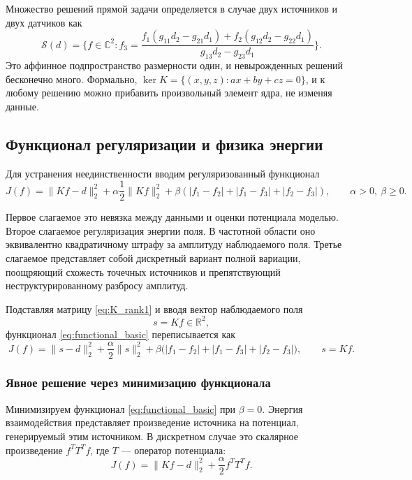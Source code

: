 \documentclass[sn-mathphys-num]{bst/sn-jnl}
\theoremstyle{thmstylethree}
\theoremstyle{thmstyletwo}
\theoremstyle{thmstyleone}
\begin{document}
Множество решений прямой задачи определяется в случае двух источников и двух датчиков как
\begin{equation}\label{eq:data_line}
    \mathcal{S}(d)=\{f\in\mathbb{C}^2: f_3 = \frac{f_1(g_{11}d_2 - g_{21}d_1) + f_2(g_{12}d_2-g_{22}d_1)}{g_{13}d_2-g_{23}d_1}\}.
\end{equation}
Это аффинное подпространство размерности один, и невырожденных решений бесконечно много. 
Формально, $\ker K=\{(x,y,z): a x+b y+c z=0\}$, и к любому решению можно прибавить произвольный элемент ядра, не изменяя данные.

\subsection{Функционал регуляризации и физика энергии}

Для устранения неединственности вводим регуляризованный функционал
\begin{equation}\label{eq:functional_basic}
    J(f)=\|K f-d\|_2^2 + \alpha \frac12 \|K f\|_2^2 + \beta (|f_1-f_2| + |f_1-f_3| + |f_2-f_3|),
    \qquad \alpha>0,\ \beta\ge0.
\end{equation}

Первое слагаемое это невязка между данными и оценки потенциала моделью. Второе слагаемое регуляризация энергии поля.
В частотной области оно эквивалентно квадратичному штрафу за амплитуду наблюдаемого поля. 
Третье слагаемое представляет собой дискретный вариант полной вариации,
поощряющий схожесть точечных источников и препятствующий неструктурированному разбросу амплитуд.

Подставляя матрицу \eqref{eq:K_rank1} и вводя вектор наблюдаемого поля
\begin{equation}\label{eq:field_observation}
    s = K f \in \mathbb{R}^2,
\end{equation}
функционал \eqref{eq:functional_basic} переписывается как
\begin{equation}\label{eq:functional_degenerate}
    J(f)=\|s-d\|_2^2 + \frac{\alpha}{2}\|s\|_2^2 + \beta \bigl(|f_1-f_2| + |f_1-f_3| + |f_2-f_3|\bigr),
    \qquad s=Kf.
\end{equation}

\subsubsection{Явное решение через минимизацию функционала}

Минимизируем функционал \eqref{eq:functional_basic} при $\beta=0$. Энергия взаимодействия представляет 
произведение источника на потенциал, генерируемый этим источником. В дискретном случае это скалярное 
произведение $f^T T^T f$, где $T$ — оператор потенциала:
\begin{equation}
    J(f) = \|Kf-d\|_2^2 + \frac{\alpha}{2}f^T T^T f.
\end{equation}
\end{document}
